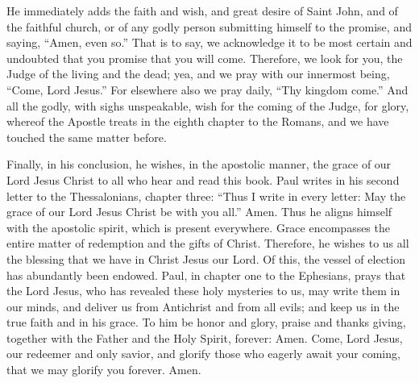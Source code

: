 He immediately adds the faith and wish, and great desire of Saint John, and of the faithful church, or of any godly person submitting himself to the promise, and saying, “Amen, even so.” That is to say, we acknowledge it to be most certain and undoubted that you promise that you will come. Therefore, we look for you, the Judge of the living and the dead; yea, and we pray with our innermost being, “Come, Lord Jesus.” For elsewhere also we pray daily, “Thy kingdom come.” And all the godly, with sighs unspeakable, wish for the coming of the Judge, for glory, whereof the Apostle treats in the eighth chapter to the Romans, and we have touched the same matter before.

Finally, in his conclusion, he wishes, in the apostolic manner, the grace of our Lord Jesus Christ to all who hear and read this book. Paul writes in his second letter to the Thessalonians, chapter three: “Thus I write in every letter: May the grace of our Lord Jesus Christ be with you all.” Amen. Thus he aligns himself with the apostolic spirit, which is present everywhere. Grace encompasses the entire matter of redemption and the gifts of Christ. Therefore, he wishes to us all the blessing that we have in Christ Jesus our Lord. Of this, the vessel of election has abundantly been endowed. Paul, in chapter one to the Ephesians, prays that the Lord Jesus, who has revealed these holy mysteries to us, may write them in our minds, and deliver us from Antichrist and from all evils; and keep us in the true faith and in his grace. To him be honor and glory, praise and thanks giving, together with the Father and the Holy Spirit, forever: Amen. Come, Lord Jesus, our redeemer and only savior, and glorify those who eagerly await your coming, that we may glorify you forever. Amen.
